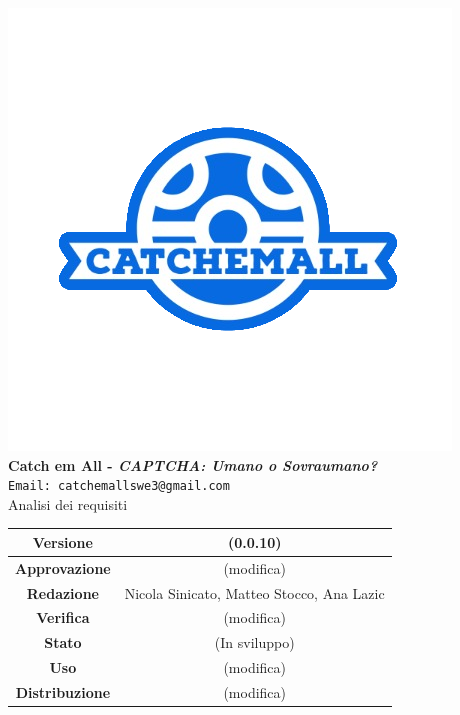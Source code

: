 \begin{titlepage}
\begin{center}
	\includegraphics[scale = 1.5]{img/logo.png}\\
	\bigskip
	\large \textbf{Catch em All - \textit{CAPTCHA: Umano o Sovraumano?}}\\
	\texttt{Email: catchemallswe3@gmail.com}\\
	\vfill
	{\fontsize{1.5cm}{0}\selectfont Analisi dei requisiti}\\
	\vfill
	\begin{tabularx}{\textwidth}{| c | c |}
		\hline
		\textbf{Versione} & (0.0.10)\\
		\hline
		\textbf{Approvazione} & (modifica)\\
		\hline
		\textbf{Redazione} & Nicola Sinicato, Matteo Stocco, Ana Lazic\\
		\hline
		\textbf{Verifica} & (modifica)\\
		\hline
		\textbf{Stato} & (In sviluppo)\\
		\hline
		\textbf{Uso} & (modifica)\\
		\hline
		\textbf{Distribuzione} & (modifica)\\
		\hline
	\end{tabularx}
\end{center}
\end{titlepage}